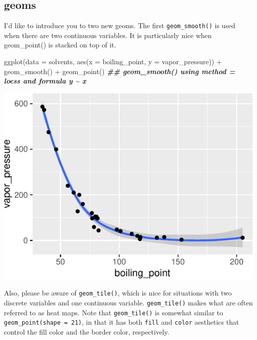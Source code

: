 \documentclass[
]{krantz}
\newenvironment{Shaded}{\begin{snugshade}}{\end{snugshade}}
\newcommand{\AttributeTok}[1]{\textcolor[rgb]{0.77,0.63,0.00}{#1}}
\newcommand{\DocumentationTok}[1]{\textcolor[rgb]{0.56,0.35,0.01}{\textbf{\textit{#1}}}}
\newcommand{\FunctionTok}[1]{\textcolor[rgb]{0.00,0.00,0.00}{#1}}
\newcommand{\NormalTok}[1]{#1}
\newcommand{\SpecialCharTok}[1]{\textcolor[rgb]{0.00,0.00,0.00}{#1}}
\begin{document}
\hypertarget{geoms}{%
\subsection{geoms}\label{geoms}}

I'd like to introduce you to two new geoms. The first \texttt{geom\_smooth()} is used when there are two continuous variables. It is particularly nice when geom\_point() is stacked on top of it.

\begin{Shaded}
\begin{Highlighting}[]
\FunctionTok{ggplot}\NormalTok{(}\AttributeTok{data =}\NormalTok{ solvents, }\FunctionTok{aes}\NormalTok{(}\AttributeTok{x =}\NormalTok{ boiling\_point, }\AttributeTok{y =}\NormalTok{ vapor\_pressure)) }\SpecialCharTok{+} 
  \FunctionTok{geom\_smooth}\NormalTok{() }\SpecialCharTok{+}
  \FunctionTok{geom\_point}\NormalTok{()}
\DocumentationTok{\#\# \textasciigrave{}geom\_smooth()\textasciigrave{} using method = \textquotesingle{}loess\textquotesingle{} and formula \textquotesingle{}y \textasciitilde{} x\textquotesingle{}}
\end{Highlighting}
\end{Shaded}

\begin{center}\includegraphics[width=0.8\linewidth]{index_files/figure-latex/unnamed-chunk-55-1} \end{center}

Also, please be aware of \texttt{geom\_tile()}, which is nice for situations with two discrete variables and one continuous variable. \texttt{geom\_tile()} makes what are often referred to as heat maps. Note that \texttt{geom\_tile()} is somewhat similar to \texttt{geom\_point(shape\ =\ 21)}, in that it has both \texttt{fill} and \texttt{color} aesthetics that control the fill color and the border color, respectively.
\end{document}
